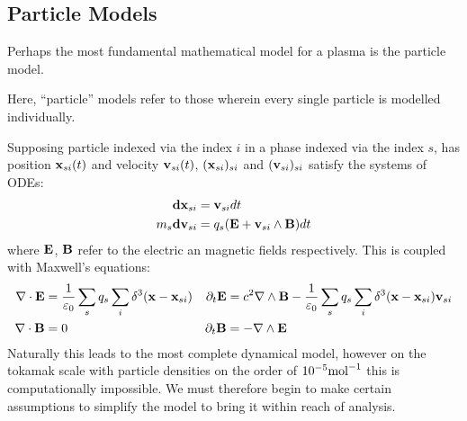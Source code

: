 \subsection*{Particle Models}
    Perhaps the most fundamental mathematical model for a plasma is the particle model.
    \begin{definition}
        Here, ``particle'' models refer to those wherein every single particle is modelled individually.
    \end{definition}
    Supposing particle indexed via the index $i$ in a phase indexed via the index $s$, has position $\mathbf{x}_{si}(t)$ and velocity $\mathbf{v}_{si}(t)$, $(\mathbf{x}_{si})_{si}$ and $(\mathbf{v}_{si})_{si}$ satisfy the systems of ODEs:
    \begin{align}
        \mathbf{d}\mathbf{x}_{si}  &=  \mathbf{v}_{si} dt  \label{patricle motion}  \\
        m_{s}\mathbf{d}\mathbf{v}_{si}  &=  q_{s}(\mathbf{E} + \mathbf{v}_{si}\wedge\mathbf{B})dt  \label{particle forcing}
    \end{align}
    where $\mathbf{E}$, $\mathbf{B}$ refer to the electric an magnetic fields respectively. This is coupled with Maxwell's equations:
    \begin{align*}
        \nabla\cdot\mathbf{E}  &=  \frac{1}{\varepsilon_{0}}\sum_{s}q_{s}\sum_{i}\delta^{3}(\mathbf{x} - \mathbf{x}_{si})  &
        \partial_{t}\mathbf{E}  &=  c^{2}\nabla\wedge\mathbf{B} - \frac{1}{\varepsilon_{0}}\sum_{s}q_{s}\sum_{i}\delta^{3}(\mathbf{x} - \mathbf{x}_{si})\mathbf{v}_{si}  \\
        \nabla\cdot\mathbf{B}  &=  0  &
        \partial_{t}\mathbf{B}  &=  - \nabla\wedge\mathbf{E}
    \end{align*}
    Naturally this leads to the most complete dynamical model, however on the tokamak scale with particle densities on the order of $10^{- 5}{\rm mol}^{- 1}$ this is computationally impossible. We must therefore begin to make certain assumptions to simplify the model to bring it within reach of analysis.
    